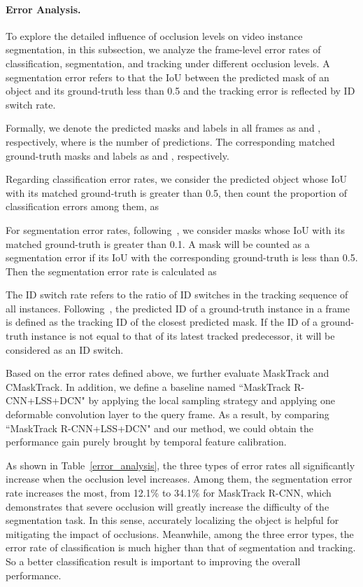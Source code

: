 \documentclass[twocolumn]{svjour3}          \smartqed  \usepackage{graphicx}
\def\myTextColor{\textcolor[rgb]{0, 0, 0}}
\begin{document}
\begin{sloppypar}
\paragraph{Error Analysis.}To explore the detailed influence of occlusion levels on video instance segmentation, in this subsection, we analyze the frame-level error rates of classification, segmentation, and tracking under different occlusion levels. A segmentation error refers to that the IoU between the predicted mask of an object and its ground-truth less than 0.5 and the tracking error is reflected by ID switch rate.

Formally, we denote the predicted masks and labels in all frames as  and , respectively, where  is the number of predictions. The corresponding matched ground-truth masks and labels as  and , respectively.

Regarding classification error rates, we consider the predicted object whose IoU with its matched ground-truth is greater than 0.5, then count the proportion of classification errors among them, as



For segmentation error rates, following~\cite{tide}, we consider masks whose IoU with its matched ground-truth is greater than 0.1. A mask  will be counted as a segmentation error if its IoU with the corresponding ground-truth  is less than 0.5. Then the segmentation error rate is calculated as


The ID switch rate refers to the ratio of ID switches in the tracking sequence of all instances. Following~\cite{mots}, the predicted ID of a ground-truth instance in a frame is defined as the tracking ID of the closest predicted mask. If the ID of a ground-truth instance is not equal to that of its latest tracked predecessor, it will be considered as an ID switch.

\myTextColor{Based on the error rates defined above, we further evaluate MaskTrack and CMaskTrack. In addition, we define a baseline named ``MaskTrack R-CNN+LSS+DCN" by applying the local sampling strategy and applying one deformable convolution layer to the query frame. As a result, by comparing ``MaskTrack R-CNN+LSS+DCN" and our method, we could obtain the performance gain purely brought by temporal feature calibration.}


As shown in Table~\ref{error_analysis}, \myTextColor{the three types of error rates all significantly increase when the occlusion level increases. Among them, the segmentation error rate increases the most, from 12.1\% to 34.1\% for MaskTrack R-CNN}, which demonstrates that severe occlusion will greatly increase the difficulty of the segmentation task. In this sense, accurately localizing the object is helpful for mitigating the impact of occlusions.
\myTextColor{Meanwhile, among the three error types, the error rate of classification is much higher than that of segmentation and tracking. So a better classification result is important to improving the overall performance.}



\end{sloppypar}
\end{document}
